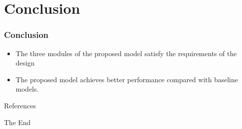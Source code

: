 \documentclass{beamer}
\begin{document}
\section{Conclusion}
\begin{frame}
  \frametitle{Conclusion}
  \begin{itemize}
    \item The three modules of the proposed model satisfy the requirements of the design
    \item The proposed model achieves better performance compared with baseline models.
  \end{itemize}
\end{frame}

\begin{frame}[allowframebreaks]{References}
  
  
\end{frame}


\begin{frame}
  \Huge{\centerline{The End}}
\end{frame}

\end{document}
